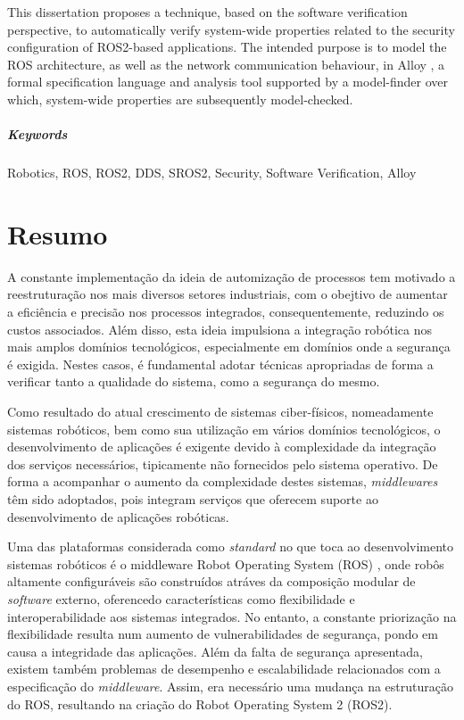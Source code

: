 \documentclass[
  oneside,
  11pt, a4paper,
  footinclude=true,
  headinclude=true,
  cleardoublepage=empty
]{scrbook}
\begin{document}
	This dissertation proposes a technique, based on the software verification perspective, to automatically verify system-wide properties related to the security configuration of ROS2-based applications. The intended purpose is to model the ROS architecture, as well as the network communication behaviour, in Alloy \cite{alloy-6}, a formal specification language and analysis tool supported by a model-finder over which, system-wide properties are subsequently model-checked.

\paragraph{Keywords} Robotics, ROS, ROS2, DDS, SROS2, Security, Software Verification, Alloy
	\cleardoublepage

\chapter*{Resumo}

	A constante implementação da ideia de automização de processos tem motivado a reestruturação nos mais diversos setores industriais, com o obejtivo de aumentar a eficiência e precisão nos processos integrados, consequentemente, reduzindo os custos associados. Além disso, esta ideia impulsiona a integração robótica nos mais amplos domínios tecnológicos, especialmente em domínios onde a segurança é exigida. Nestes casos, é fundamental adotar técnicas apropriadas de forma a verificar tanto a qualidade do sistema, como a segurança do mesmo.

	Como resultado do atual crescimento de sistemas ciber-físicos, nomeadamente sistemas robóticos, bem como sua utilização em vários domínios tecnológicos, o desenvolvimento de aplicações é exigente devido à complexidade da integração dos serviços necessários, tipicamente não fornecidos pelo sistema operativo. De forma a acompanhar o aumento da complexidade destes sistemas, \textit{middlewares} têm sido adoptados, pois integram serviços que oferecem suporte ao desenvolvimento de aplicações robóticas.

	Uma das plataformas considerada como \textit{standard} no que toca ao desenvolvimento sistemas robóticos é o middleware Robot Operating System (ROS) \cite{1}, onde robôs altamente configuráveis são construídos atráves da composição modular de \textit{software} externo, oferencedo características como flexibilidade e interoperabilidade aos sistemas integrados. No entanto, a constante priorização na flexibilidade resulta num aumento de vulnerabilidades de segurança, pondo em causa a integridade das aplicações. Além da falta de segurança apresentada, existem também problemas de desempenho e escalabilidade relacionados com a especificação do \textit{middleware}. Assim, era necessário uma mudança na estruturação do ROS, resultando na criação do Robot Operating System 2 (ROS2).
\end{document}
